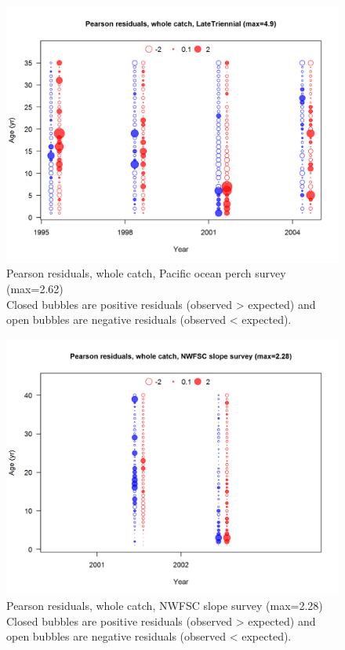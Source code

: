 \documentclass[12pt,]{article}
\begin{document}
\begin{figure}
\centering
\includegraphics{r4ss/plots_mod1/comp_agefit_residsflt4mkt0.png}
\caption{Pearson residuals, whole catch, Pacific ocean perch survey
(max=2.62)\\
Closed bubbles are positive residuals (observed \textgreater{} expected)
and open bubbles are negative residuals (observed \textless{} expected).
\label{fig:pop_age_pearson}}
\end{figure}

\begin{figure}
\centering
\includegraphics{r4ss/plots_mod1/comp_agefit_residsflt7mkt0.png}
\caption{Pearson residuals, whole catch, NWFSC slope survey (max=2.28)\\
Closed bubbles are positive residuals (observed \textgreater{} expected)
and open bubbles are negative residuals (observed \textless{} expected).
\label{fig:nwfsc_age_pearson}}
\end{figure}
\end{document}
